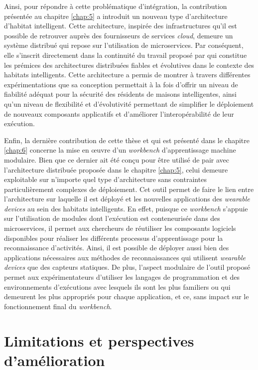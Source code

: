 Ainsi, pour répondre à cette problématique d'intégration, la contribution présentée au chapitre \ref{chap:5} a introduit un nouveau type d'architecture d'habitat intelligent. Cette architecture, inspirée des infrastructures qu'il est possible de retrouver auprès des fournisseurs de services \textit{cloud}, demeure un système distribué qui repose sur l'utilisation de microservices. Par conséquent,  elle s'inscrit directement dans la continuité du travail proposé par \cite{Plantevin2018} qui constitue les prémices des architectures distribuées fiables et évolutives dans le contexte des habitats intelligents. Cette architecture a permis de montrer à travers différentes expérimentations que sa conception permettait à la fois d'offrir un niveau de fiabilité adéquat pour la sécurité des résidents de maisons intelligentes, ainsi qu'un niveau de flexibilité et d'évolutivité permettant de simplifier le déploiement de nouveaux composants applicatifs et d'améliorer l'interopérabilité de leur exécution.

Enfin, la dernière contribution de cette thèse et qui est présenté dans le chapitre \ref{chap:6} concerne la mise en \oe{}uvre d'un \textit{workbench} d'apprentissage machine modulaire. Bien que ce dernier ait été conçu pour être utilisé de pair avec l'architecture distribuée proposée dans le chapitre \ref{chap:5}, celui demeure exploitable sur n'importe quel type d'architecture sans contraintes particulièrement complexes de déploiement. Cet outil permet de faire le lien entre l'architecture sur laquelle il est déployé et les nouvelles applications des \textit{wearable devices} au sein des habitats intelligents. En effet, puisque ce \textit{workbench} s'appuie sur l'utilisation de modules dont l'exécution est conteneurisée dans des microservices, il permet aux chercheurs de réutiliser les composants logiciels disponibles pour réaliser les différents processus d'apprentissage pour la reconnaissance d'activités. Ainsi, il est possible de déployer aussi bien des applications nécessaires aux méthodes de reconnaissances qui utilisent \textit{wearable devices} que des capteurs statiques. De plus, l'aspect modulaire de l'outil proposé permet aux expérimentateurs d'utiliser les langages de programmation et des environnements d'exécutions avec lesquels ils sont les plus familiers ou qui demeurent les plus appropriés pour chaque application, et ce, sans impact sur le fonctionnement final du \textit{workbench}.

\section{Limitations et perspectives d'amélioration}

